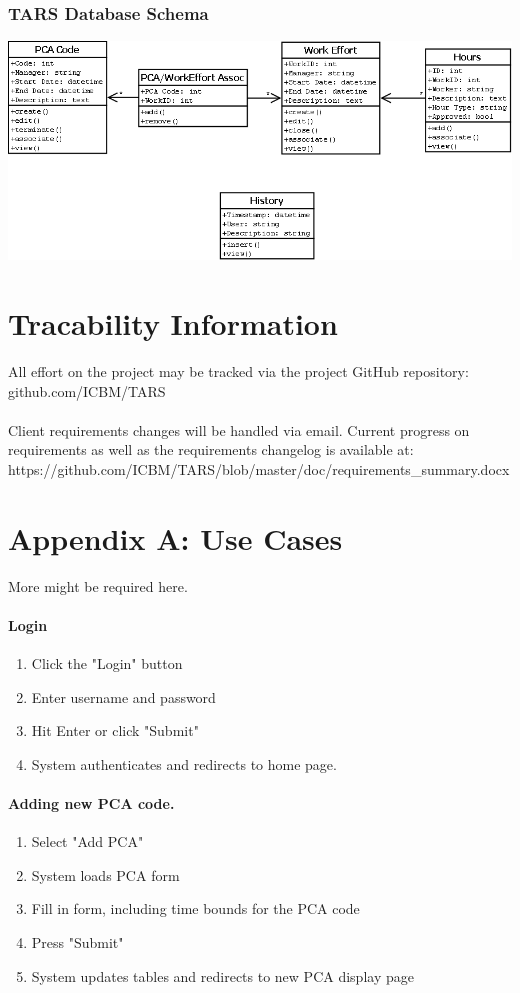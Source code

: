 \documentclass[letterpaper]{article}
\begin{document}
\subsubsection{TARS Database Schema}
\includegraphics[scale=0.4]{../design/images/class_diagram_1.png}
\section{Tracability Information}
All effort on the project may be tracked via the project GitHub repository: github.com/ICBM/TARS\\
\\
Client requirements changes will be handled via email. Current progress on requirements as well as the requirements changelog is available at: https://github.com/ICBM/TARS/blob/master/doc/requirements\_summary.docx
\section{Appendix A: Use Cases} 
More might be required here.

\paragraph{Login}
\begin{enumerate}
\item Click the "Login" button
\item Enter username and password
\item Hit Enter or click "Submit"
\item System authenticates and redirects to home page.
\end{enumerate}

\paragraph{Adding new PCA code.}
\begin{enumerate}
\item Select "Add PCA"
\item System loads PCA form
\item Fill in form, including time bounds for the PCA code
\item Press "Submit"
\item System updates tables and redirects to new PCA display page
\end{enumerate}
\end{document}
